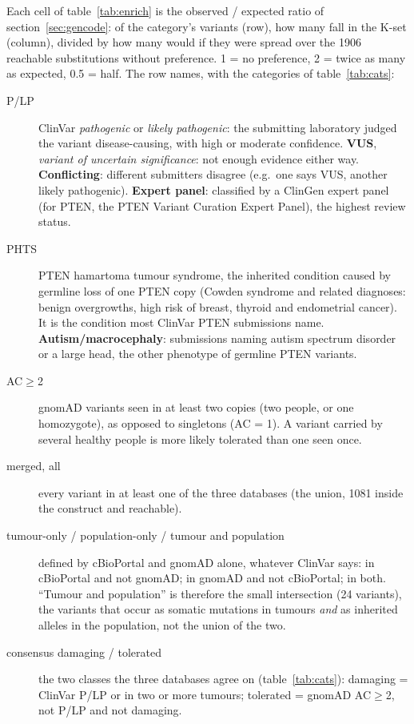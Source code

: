 \documentclass[11pt,a4paper]{article}
\begin{document}
Each cell of table~\ref{tab:enrich} is the observed / expected ratio of
section~\ref{sec:gencode}: of the category's variants (row), how many fall in
the K-set (column), divided by how many would if they were spread over the
1906 reachable substitutions without preference. 1 = no preference, 2 = twice
as many as expected, 0.5 = half. The row names, with the categories of
table~\ref{tab:cats}:
\begin{description}
\item[P/LP] ClinVar \emph{pathogenic} or \emph{likely pathogenic}: the
  submitting laboratory judged the variant disease-causing, with high or
  moderate confidence. \textbf{VUS}, \emph{variant of uncertain
  significance}: not enough evidence either way. \textbf{Conflicting}:
  different submitters disagree (e.g.\ one says VUS, another likely
  pathogenic). \textbf{Expert panel}: classified by a ClinGen expert panel
  (for PTEN, the PTEN Variant Curation Expert Panel), the highest review status.
\item[PHTS] PTEN hamartoma tumour syndrome, the inherited condition caused by
  germline loss of one PTEN copy (Cowden syndrome and related diagnoses:
  benign overgrowths, high risk of breast, thyroid and endometrial cancer).
  It is the condition most ClinVar PTEN submissions name.
  \textbf{Autism/macrocephaly}: submissions naming autism spectrum disorder or
  a large head, the other phenotype of germline PTEN variants.
\item[AC$\ge$2] gnomAD variants seen in at least two copies (two people, or
  one homozygote), as opposed to singletons (AC = 1). A variant carried by
  several healthy people is more likely tolerated than one seen once.
\item[merged, all] every variant in at least one of the three databases
  (the union, 1081 inside the construct and reachable).
\item[tumour-only / population-only / tumour and population] defined by
  cBioPortal and gnomAD alone, whatever ClinVar says: in cBioPortal and not
  gnomAD; in gnomAD and not cBioPortal; in both. ``Tumour and population''
  is therefore the small intersection (24 variants), the variants that occur
  as somatic mutations in tumours \emph{and} as inherited alleles in the
  population, not the union of the two.
\item[consensus damaging / tolerated] the two classes the three databases
  agree on (table~\ref{tab:cats}): damaging = ClinVar P/LP or in two or more
  tumours; tolerated = gnomAD AC$\ge$2, not P/LP and not damaging.
\end{description}
\end{document}
